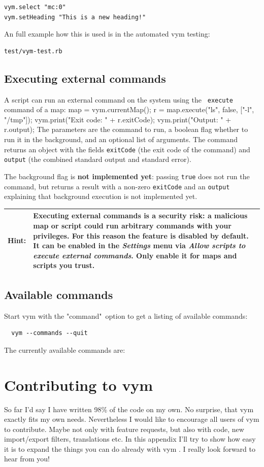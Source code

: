 \documentclass[12pt,a4paper]{article}
\newcommand{\hint}[1]{
    \begin{center} 
        \begin{tabular}{|rp{12cm}|} \hline
            {\bf Hint}:& #1\\   \hline
        \end{tabular}
            \marginpar{\Huge !} 
    \end{center} 
}
\newcommand{\vym}{{\sc vym }}
\newenvironment{code}[1] { \verbatim #1}{\endverbatim  }
\begin{document}
\begin{appendix}
\begin{verbatim}
vym.select "mc:0"
vym.setHeading "This is a new heading!"
\end{verbatim}

An full example how this is
used is in the automated \vym testing:
\begin{verbatim}
test/vym-test.rb
\end{verbatim}

\subsection{Executing external commands} \label{executecommand}
A script can run an external command on the system using the {\tt
execute} command of a map:
\begin{code}
map = vym.currentMap();
r = map.execute("ls", false, ["-l", "/tmp"]);
vym.print("Exit code: " + r.exitCode);
vym.print("Output: "    + r.output);
\end{code}
The parameters are the command to run, a boolean flag whether to run it
in the background, and an optional list of arguments. The command
returns an object with the fields {\tt exitCode} (the exit code of the
command) and {\tt output} (the combined standard output and standard
error).

The background flag is {\bf not implemented yet}: passing {\tt true} does
not run the command, but returns a result with a non-zero {\tt exitCode}
and an {\tt output} explaining that background execution is not
implemented yet.

\hint{Executing external commands is a security risk: a malicious map or
script could run arbitrary commands with your privileges. For this
reason the feature is {\bf disabled by default}. It can be enabled in
the {\em Settings} menu via {\em Allow scripts to execute external
commands}. Only enable it for maps and scripts you trust.}

\subsection{Available commands}
Start vym with the "command"\ option to get a listing of available
commands:
\begin{verbatim}
  vym --commands --quit
\end{verbatim}
The currently available commands are:
\begin{itemize}
    
\end{itemize}



\section{Contributing to \vym}
So far I'd say I have written 98\% of the code on my own. No surprise,
that \vym exactly fits my own needs. Nevertheless I would like to
encourage all users of  \vym to contribute. Maybe not only with feature
requests, but also with code, new import/export filters, translations
etc. In this appendix I'll try to show how easy it is to expand the
things you can do already with \vym. I really look forward to hear from
you!


\end{appendix}
\end{document}
